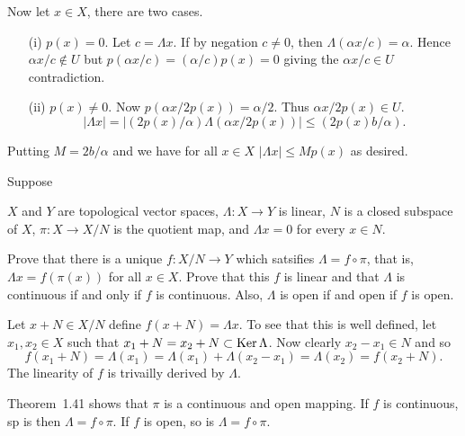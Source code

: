 \begin{enumerate}
\begin{itemize}
  Now let \(x \in X\), there are two cases.
  \begin{itemize}
   \item[(i)]
     \(p(x)=0\).\newline
     Let \(c = \Lambda x\).
     If by negation \(c\neq 0\), then \(\Lambda(\alpha x/c) = \alpha\).
     Hence \(\alpha x/c \notin U\) but \(p(\alpha x/c) = (\alpha/c)p(x) = 0\)
     giving the \(\alpha x/c \in U\) contradiction.
   \item[(ii)]
    \(p(x)\neq 0\).\newline
     Now \(p(\alpha x/2p(x)) = \alpha/2\).
     Thus \(\alpha x/2p(x) \in U\).
     \begin{equation*}
     |\Lambda x| = | (2p(x)/\alpha) \Lambda (\alpha  x/2p(x))| 
      \leq (2p(x)b/\alpha).
     \end{equation*}
   \end{itemize}
   Putting \(M = 2b/\alpha\) and we have for all \(x\in X\)
   \(|\Lambda x| \leq Mp(x)\) as desired.
  
\end{itemize}

\begin{excopy}
Suppose \label{ex:1:9}
 \begin{itemize}
   $X$ and $Y$ are topological vector spaces,
   \(\Lambda: X\rightarrow Y\) is linear,
   $N$ is a closed subspace of $X$,
   \(\pi:X \rightarrow X/N\) is the quotient map, and
   \(\Lambda x = 0\) for every \(x\in N\).
 \end{itemize}
Prove that there is a unique \(f:X/N \rightarrow Y\) which satsifies
\(\Lambda = f \circ \pi\), that is,
\(\Lambda x = f(\pi(x))\) for all \(x\in X\).
Prove that this $f$ is linear and that \(\Lambda\) is continuous
if and only if $f$ is continuous. Also, \(\Lambda\) is open if and open if 
$f$ is open.
\end{excopy}

Let \(x+N\in X/N\) define \(f(x+N) = \Lambda x\).
To see that this is well defined, let \(x_1,x_2\in X\)
such that \(x_1 + N = x_2 + N \subset \mathop{\rm Ker}\nolimits \Lambda\).
Now clearly \(x_2 - x_1 \in N\) and so
\begin{equation*}
f(x_1 + N) = \Lambda (x_1) = \Lambda(x_1) + \Lambda(x_2 - x_1) = 
  \Lambda(x_2) = f(x_2 + N).
\end{equation*}
The linearity  of $f$ is trivailly derived by \(\Lambda\).

Theorem~1.41 shows that \(\pi\) is a continuous and open mapping.
If $f$ is continuous, sp is then \(\Lambda = f \circ \pi\).
If $f$ is open, so is \(\Lambda = f \circ \pi\).


\end{enumerate}
